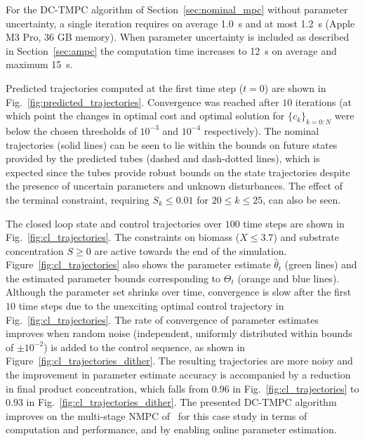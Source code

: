 \documentclass[final,5p,times,twocolumn,authoryear]{elsarticle}
\begin{document}
For the DC-TMPC algorithm
of Section~\ref{sec:nominal_mpc}
without parameter uncertainty, a single iteration requires on average \SI{1.0}{\second} and at most \SI{1.2}{\second} (Apple M3 Pro, 36 GB memory). When parameter uncertainty is included as described in Section~\ref{sec:ampc} the computation time increases to \SI{12}{\second} on average and maximum \SI{15}{\second}.

Predicted trajectories computed at the first time step ($t=0$) are shown in Fig.~\ref{fig:predicted_trajectories}. Convergence was reached after $10$ iterations (at which point the changes in optimal cost and optimal solution for $\{c_k\}_{k=0:N}$ were below the chosen thresholds of $10^{-3}$ and $10^{-4}$ respectively).
The nominal trajectories (solid lines) can be seen to lie within the bounds on future states provided by the predicted tubes (dashed and dash-dotted lines), which is expected since the tubes provide robust bounds on the state trajectories despite the presence of uncertain parameters and unknown disturbances. The effect of the terminal constraint, requiring $S_k \leq 0.01$ for $20 \leq k \leq 25$, can also be seen.

The closed loop state and control trajectories over $100$ time steps are shown in Fig.~\ref{fig:cl_trajectories}. The constraints on biomass ($X \leq 3.7$) and substrate concentration $S \geq 0$ are active towards the end of the simulation. Figure~\ref{fig:cl_trajectories} also
shows the parameter estimate $\hat{\theta}_t$ (green lines) and the estimated parameter bounds corresponding to $\Theta_t$ (orange and blue lines). Although the parameter set shrinks over time, convergence is slow after the first $10$ time steps due to the unexciting optimal control trajectory in Fig.~\ref{fig:cl_trajectories}. The rate of convergence of parameter estimates improves when random noise (independent, uniformly distributed within bounds of $\pm 10^{-2}$) is added to the control sequence, as shown in Figure~\ref{fig:cl_trajectories_dither}.
The resulting trajectories are more noisy %
and the improvement in parameter estimate accuracy is accompanied by a reduction in final product concentration, which falls from $0.96$ in Fig.~\ref{fig:cl_trajectories} to $0.93$ in Fig.~\ref{fig:cl_trajectories_dither}.
%
The presented DC-TMPC algorithm improves on the multi-stage NMPC of~\citet{lucia13:case_study} for this case study in terms of computation and performance, and by enabling online parameter estimation.
\end{document}
